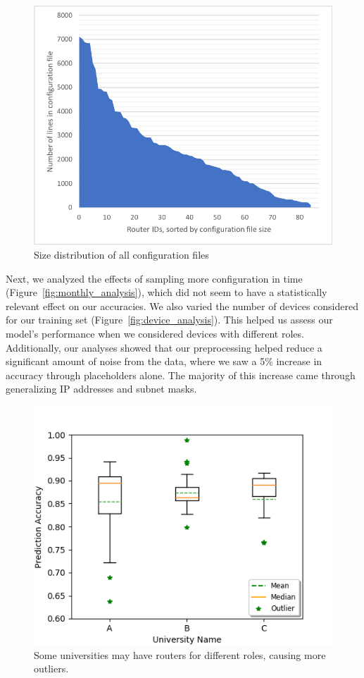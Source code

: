 \begin{figure}
	\centering
	\includegraphics[width=\columnwidth]{config_sizes.png}
	\caption{Size distribution of all configuration files}
    \label{fig:uni_analysis}
\end{figure}

Next, we analyzed the effects of sampling more configuration in time (Figure~\ref{fig:monthly_analysis}), which did not seem to have a statistically relevant effect on our accuracies. We also varied the number of devices considered for our training set (Figure~\ref{fig:device_analysis}). This helped us assess our model's performance when we considered devices with different roles. Additionally, our analyses showed that our preprocessing helped reduce a significant amount of noise from the data, where we saw a 5\% increase in accuracy through placeholders alone. The majority of this increase came through generalizing IP addresses and subnet masks.\\

\begin{figure}
	\centering
	\includegraphics[width=\columnwidth]{uni_analysis.png}
	\caption{Some universities may have routers for different roles, causing more outliers.}
    \label{fig:uni_analysis}
\end{figure}

